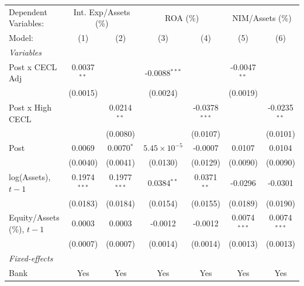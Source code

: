 
\begingroup
\centering
\begin{tabular}{lcccccc}
   \tabularnewline \midrule \midrule
   Dependent Variables: & \multicolumn{2}{c}{Int. Exp/Assets (\%)} & \multicolumn{2}{c}{ROA (\%)} & \multicolumn{2}{c}{NIM/Assets (\%)}\\
   Model:                       & (1)            & (2)            & (3)                   & (4)             & (5)            & (6)\\  
   \midrule
   \emph{Variables}\\
   Post x CECL Adj              & 0.0037$^{**}$  &                & -0.0088$^{***}$       &                 & -0.0047$^{**}$ &   \\   
                                & (0.0015)       &                & (0.0024)              &                 & (0.0019)       &   \\   
   Post x High CECL             &                & 0.0214$^{**}$  &                       & -0.0378$^{***}$ &                & -0.0235$^{**}$\\   
                                &                & (0.0080)       &                       & (0.0107)        &                & (0.0101)\\   
   Post                         & 0.0069         & 0.0070$^{*}$   & $5.45\times 10^{-5}$  & -0.0007         & 0.0107         & 0.0104\\   
                                & (0.0040)       & (0.0041)       & (0.0130)              & (0.0129)        & (0.0090)       & (0.0090)\\   
   log(Assets), $t{-}1$         & 0.1974$^{***}$ & 0.1977$^{***}$ & 0.0384$^{**}$         & 0.0371$^{**}$   & -0.0296        & -0.0301\\   
                                & (0.0183)       & (0.0184)       & (0.0154)              & (0.0155)        & (0.0189)       & (0.0190)\\   
   Equity/Assets (\%), $t{-}1$  & 0.0003         & 0.0003         & -0.0012               & -0.0012         & 0.0074$^{***}$ & 0.0074$^{***}$\\   
                                & (0.0007)       & (0.0007)       & (0.0014)              & (0.0014)        & (0.0013)       & (0.0013)\\   
   \midrule
   \emph{Fixed-effects}\\
   Bank                         & Yes            & Yes            & Yes                   & Yes             & Yes            & Yes\\  

\end{tabular}

